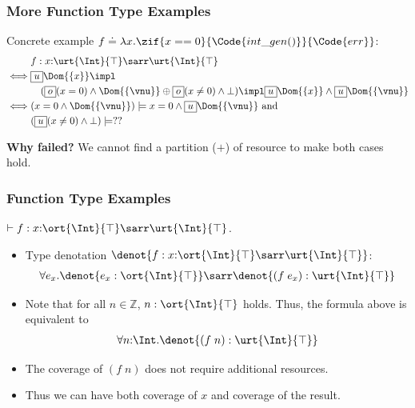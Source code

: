 \begin{frame}[fragile]
    \frametitle{More Function Type Examples}

\begin{example}[Situation 2] Concrete example $f \doteq \lambda x. \zif{x == 0}{\Code{int\_gen()}}{\Code{err}}$:
    \begin{align*}
        &f : x{:}\urt{\Int}{\top} \sarr \urt{\Int}{\top}
    \\ \iff &\supExt \Dom{\{x\}} \impl 
    \\ & \quad (\subExt (x = 0) \land \Dom{\{\vnu\}} \oplus  \subExt (x \neq 0) \land \bot) \impl \supExt \Dom{\{x\}} \land \supExt \Dom{\{\vnu\}}
    \\ \iff &(x = 0 \land \Dom{\{\vnu\}}) \models x=0 \land \supExt \Dom{\{\vnu\}} \text{ and } 
    \\ &(\supExt (x \neq 0) \land \bot) \models ??
    \end{align*} 
\end{example}

\textbf{Why failed?} We cannot find a partition ($+$) of resource to make both cases hold.

\end{frame}

\begin{frame}[fragile]
    \frametitle{Function Type Examples}

\begin{example} $\vdash f : x{:}\ort{\Int}{\top} \sarr \urt{\Int}{\top}$.
\begin{itemize}
    \item Type denotation $\denot{f: x{:}\ort{\Int}{\top} \sarr \urt{\Int}{\top}}$:
    \begin{align*}
        \forall e_x. \denot{e_x : \ort{\Int}{\top}} \sarr \denot{(f\;e_x) : \urt{\Int}{\top}}
    \end{align*}
    \item Note that for all $n \in \mathbb{Z}$, $n : \ort{\Int}{\top}$ holds. Thus, the formula above is equivalent to
    \begin{align*}
        \forall n{:}\Int. \denot{(f\;n) : \urt{\Int}{\top}}
    \end{align*}
    \item The coverage of $(f\;n)$ does not require additional resources.
    \item Thus we can have both coverage of $x$ and coverage of the result.
\end{itemize}
\end{example}

\end{frame}


